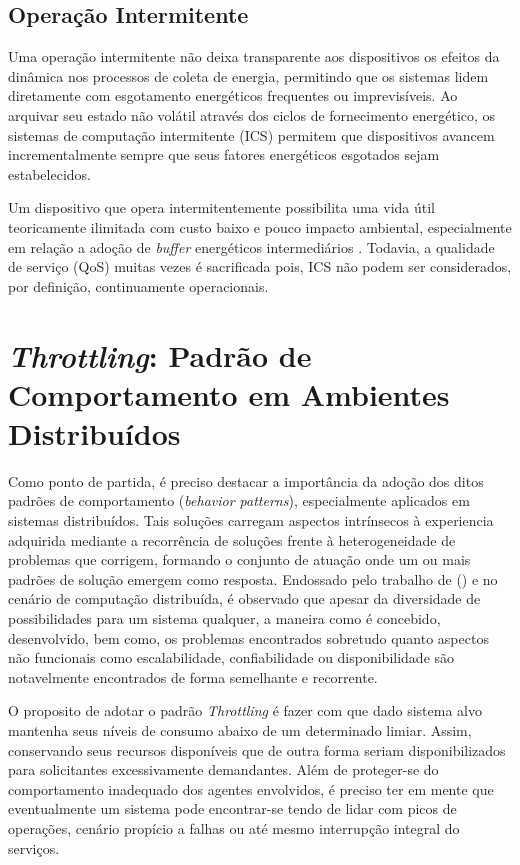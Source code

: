 \subsection{Operação Intermitente}
Uma operação intermitente não deixa transparente aos dispositivos os efeitos da dinâmica nos processos de coleta de energia, permitindo que os sistemas lidem diretamente com esgotamento energéticos frequentes ou imprevisíveis. Ao arquivar seu estado não volátil através dos ciclos de fornecimento energético, os sistemas de computação intermitente (\acl{ICS}) permitem que dispositivos avancem incrementalmente sempre que seus fatores energéticos esgotados sejam estabelecidos. 

Um dispositivo que opera intermitentemente possibilita uma vida útil teoricamente ilimitada com custo baixo e pouco impacto ambiental, especialmente em relação a adoção de \textit{buffer} energéticos intermediários \cite{sliper_energy-driven_2020}. Todavia, a qualidade de serviço (\acl{QoS}) muitas vezes é sacrificada pois, \acs{ICS} não podem ser considerados, por definição, continuamente operacionais.

\section{\textit{Throttling}: Padrão de Comportamento em Ambientes Distribuídos}
\label{cap2:throttling}

Como ponto de partida, é preciso destacar a importância da adoção dos ditos padrões de comportamento (\textit{behavior patterns}), especialmente aplicados em sistemas distribuídos. Tais soluções carregam aspectos intrínsecos à experiencia adquirida mediante a recorrência de soluções frente à heterogeneidade de problemas que corrigem, formando o conjunto de atuação onde um ou mais padrões de solução emergem como resposta. Endossado pelo trabalho de \citeauthor{burns_designing_nodate} (\citeyear{burns_designing_nodate}) e no cenário de computação distribuída, é observado que apesar da diversidade de possibilidades para um sistema qualquer, a maneira como é concebido, desenvolvido, bem como, os problemas encontrados sobretudo quanto  aspectos não funcionais como escalabilidade, confiabilidade ou disponibilidade são notavelmente encontrados de forma semelhante e recorrente.

O proposito de adotar o padrão \textit{Throttling} é fazer com que dado sistema alvo mantenha seus níveis de consumo abaixo de um determinado limiar. Assim, conservando seus recursos disponíveis que de outra forma seriam disponibilizados para solicitantes excessivamente demandantes. Além de proteger-se do comportamento inadequado dos agentes envolvidos, é preciso ter em mente que eventualmente um sistema pode encontrar-se tendo de lidar com picos de operações, cenário propício a falhas ou até mesmo interrupção integral do serviços. 

